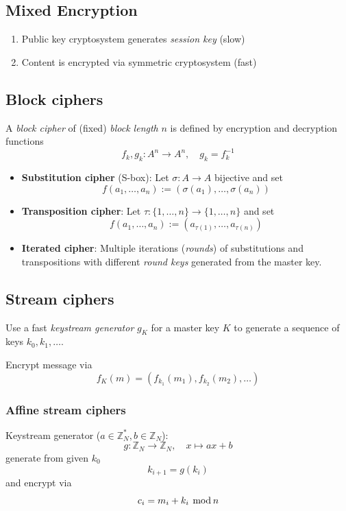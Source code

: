 \documentclass[a4paper]{scrartcl}
\newcommand\Z{\mathbb Z}
\renewcommand\mod{\hspace*{0.4em}\mathrm{mod}\hspace*{0.2em}}
\begin{document}
\subsection{Mixed Encryption}

\begin{enumerate}
    \item Public key cryptosystem generates \textit{session key} (slow)
    \item Content is encrypted via symmetric cryptosystem (fast)
\end{enumerate}

\subsection{Block ciphers}

A \textit{block cipher} of (fixed) \textit{block length} $n$ is defined by encryption and decryption functions
\[f_k,g_k:A^n\rightarrow A^n,\quad g_k=f_k^{-1}\]

\begin{itemize}
    \item \textbf{Substitution cipher} (S-box): Let $\sigma: A\rightarrow A$ bijective and set
        \[f(a_1,\hdots,a_n) := (\sigma(a_1),\hdots,\sigma(a_n))\]
    \item \textbf{Transposition cipher}: Let $\tau: \{1,\hdots,n\} \rightarrow \{1,\hdots,n\}$ and set
        \[f(a_1,\hdots,a_n) := (a_{\tau(1)},\hdots,a_{\tau(n)})\]
    \item \textbf{Iterated cipher}: Multiple iterations (\textit{rounds}) of substitutions and
        transpositions with different \textit{round keys} generated from the master key.
\end{itemize}

\subsection{Stream ciphers}

Use a fast \textit{keystream generator} $g_K$ for a master key $K$ to generate a sequence of
keys $k_0, k_1,\hdots$.

Encrypt message via \[f_K(m) = (f_{k_1}(m_1), f_{k_2}(m_2),\hdots)\]

\subsubsection{Affine stream ciphers}

Keystream generator ($a\in\Z^*_N, b\in\Z_N$):
\[g: \Z_N\rightarrow \Z_N,\quad x\mapsto ax+b\]
generate from given $k_0$
\[k_{i+1}=g(k_i)\]
and encrypt via
\[c_i = m_i + k_i \mod n\]
\end{document}

